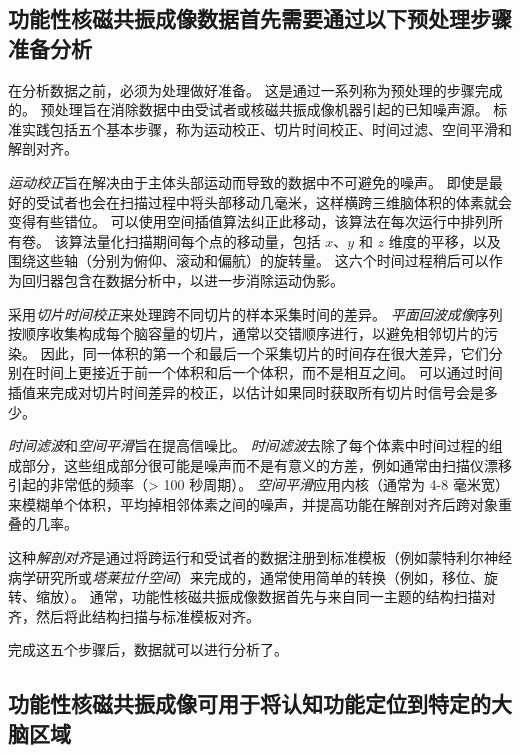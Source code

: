


\subsection{功能性核磁共振成像数据首先需要通过以下预处理步骤准备分析}

在分析数据之前，必须为处理做好准备。 
这是通过一系列称为预处理的步骤完成的。 
预处理旨在消除数据中由受试者或核磁共振成像机器引起的已知噪声源。 
标准实践包括五个基本步骤，称为运动校正、切片时间校正、时间过滤、空间平滑和解剖对齐。


\textit{运动校正}旨在解决由于主体头部运动而导致的数据中不可避免的噪声。
即使是最好的受试者也会在扫描过程中将头部移动几毫米，这样横跨三维脑体积的体素就会变得有些错位。
可以使用空间插值算法纠正此移动，该算法在每次运行中排列所有卷。
该算法量化扫描期间每个点的移动量，包括 $x$、$y$ 和 $z$ 维度的平移，以及围绕这些轴（分别为俯仰、滚动和偏航）的旋转量。
这六个时间过程稍后可以作为回归器包含在数据分析中，以进一步消除运动伪影。


采用\textit{切片时间校正}来处理跨不同切片的样本采集时间的差异。
\textit{平面回波成像}序列按顺序收集构成每个脑容量的切片，通常以交错顺序进行，以避免相邻切片的污染。
因此，同一体积的第一个和最后一个采集切片的时间存在很大差异，它们分别在时间上更接近于前一个体积和后一个体积，而不是相互之间。
可以通过时间插值来完成对切片时间差异的校正，以估计如果同时获取所有切片时信号会是多少。


\textit{时间滤波}和\textit{空间平滑}旨在提高信噪比。
\textit{时间滤波}去除了每个体素中时间过程的组成部分，这些组成部分很可能是噪声而不是有意义的方差，例如通常由扫描仪漂移引起的非常低的频率（> 100 秒周期）。 
\textit{空间平滑}应用内核（通常为 4-8 毫米宽）来模糊单个体积，平均掉相邻体素之间的噪声，并提高功能在解剖对齐后跨对象重叠的几率。


这种\textit{解剖对齐}是通过将跨运行和受试者的数据注册到标准模板（例如蒙特利尔神经病学研究所或\textit{塔莱拉什空间}）来完成的，通常使用简单的转换（例如，移位、旋转、缩放）。
通常，功能性核磁共振成像数据首先与来自同一主题的结构扫描对齐，然后将此结构扫描与标准模板对齐。


完成这五个步骤后，数据就可以进行分析了。



\subsection{功能性核磁共振成像可用于将认知功能定位到特定的大脑区域}

